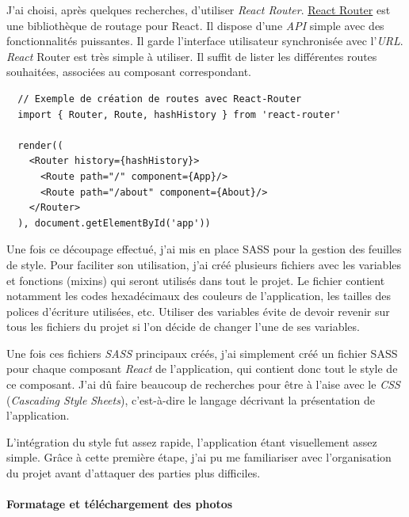 \documentclass[12pt,a4paper]{article}
\begin{document}
  J'ai choisi, après quelques recherches, d'utiliser \emph{React Router}.
  \href{https://github.com/ReactTraining/react-router}{React Router} est
  une bibliothèque de routage pour React. Il dispose d'une \emph{API}
  simple avec des fonctionnalités puissantes. Il garde l'interface
  utilisateur synchronisée avec l'\emph{URL}. \emph{React} Router est très
  simple à utiliser. Il suffit de lister les différentes routes
  souhaitées, associées au composant correspondant.

  \begin{verbatim}
  // Exemple de création de routes avec React-Router
  import { Router, Route, hashHistory } from 'react-router'

  render((
    <Router history={hashHistory}>
      <Route path="/" component={App}/>
      <Route path="/about" component={About}/>
    </Router>
  ), document.getElementById('app'))
  \end{verbatim}

  \bigskip

  Une fois ce découpage effectué, j'ai mis en place SASS pour la gestion
  des feuilles de style. Pour faciliter son utilisation, j'ai créé
  plusieurs fichiers avec les variables et fonctions (mixins) qui seront
  utilisés dans tout le projet. Le fichier contient notamment les codes
  hexadécimaux des couleurs de l'application, les tailles des polices
  d'écriture utilisées, etc. Utiliser des variables évite de devoir
  revenir sur tous les fichiers du projet si l'on décide de changer l'une
  de ses variables.

  \bigskip

  Une fois ces fichiers \emph{SASS} principaux créés, j'ai simplement créé
  un fichier SASS pour chaque composant \emph{React} de l'application, qui
  contient donc tout le style de ce composant. J'ai dû faire beaucoup de
  recherches pour être à l'aise avec le \emph{CSS} (\emph{Cascading Style
  Sheets}), c'est-à-dire le langage décrivant la présentation de
  l'application.

  \bigskip

  L'intégration du style fut assez rapide, l'application étant
  visuellement assez simple. Grâce à cette première étape, j'ai pu me
  familiariser avec l'organisation du projet avant d'attaquer des parties
  plus difficiles.

  \bigskip

  \paragraph{Formatage et téléchargement des
  photos}\label{formatage-et-tuxe9luxe9chargement-des-photos}
\end{document}
